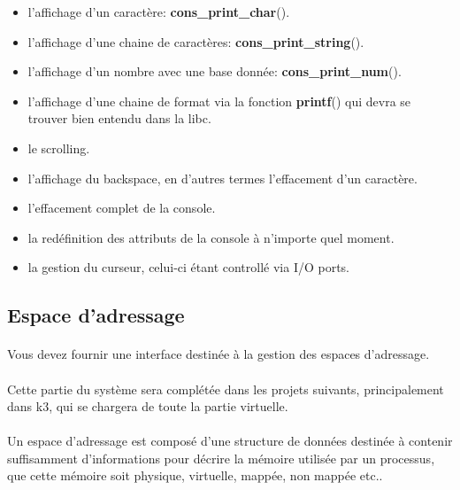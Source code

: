\documentclass[10pt,a4wide]{article}
\begin{document}
\begin{itemize}
\item l'affichage d'un caract\`ere: \textbf{cons\_print\_char}().
\item l'affichage d'une chaine de caract\`eres: \textbf{cons\_print\_string}().
\item l'affichage d'un nombre avec une base donn\'ee:
      \textbf{cons\_print\_num}().
\item l'affichage d'une chaine de format via la fonction \textbf{printf}() qui
      devra se trouver bien entendu dans la libc.
\item le scrolling.
\item l'affichage du backspace, en d'autres termes l'effacement
      d'un caract\`ere.
\item l'effacement complet de la console.
\item la red\'efinition des attributs de la console \`a n'importe quel moment.
\item la gestion du curseur, celui-ci \'etant controll\'e via I/O ports.
\end{itemize}

\subsection{Espace d'adressage}

\paragraph{}

Vous devez fournir une interface destin\'ee \`a la gestion des
espaces d'adressage.

\paragraph{}

Cette partie du syst\`eme sera compl\'et\'ee dans les projets suivants,
principalement dans k3, qui se chargera de toute la partie virtuelle.

\paragraph{}

Un espace d'adressage est compos\'e d'une structure de donn\'ees destin\'ee
\`a contenir suffisamment d'informations pour d\'ecrire la m\'emoire
utilis\'ee par un processus, que cette m\'emoire soit physique, virtuelle,
mapp\'ee, non mapp\'ee etc..
\end{document}
